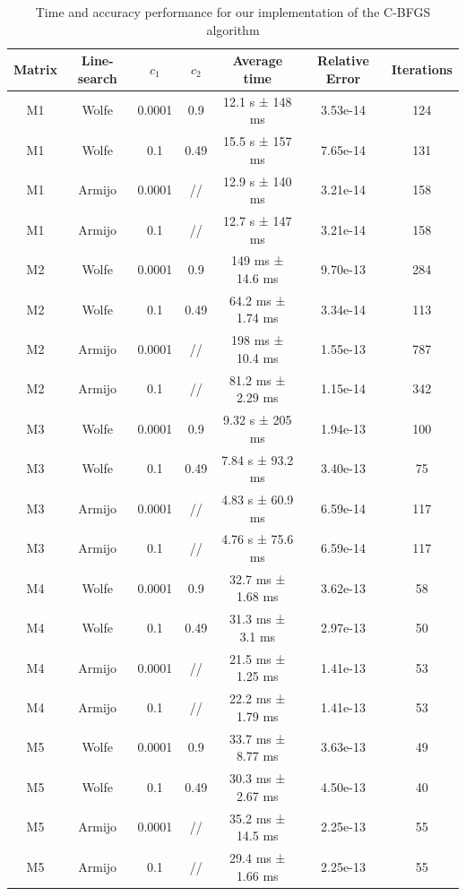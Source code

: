 \documentclass{article}
\numberwithin{equation}{section}
\begin{document}
\begin{table}[H]
    \centering
    \begin{tabular}{||c c c c c c c||}
 \hline
 Matrix & Line-search & $c_1$ & $c_2$ & Average time & Relative Error & Iterations \\ [0.8ex] 
 \hline\hline
 M1 & Wolfe & 0.0001 & 0.9 & 12.1 s ± 148 ms & 3.53e-14 & 124 \\ 
 \hline
 M1 & Wolfe & 0.1 & 0.49 & 15.5 s ± 157 ms & 7.65e-14 & 131 \\ 
 \hline
 M1 & Armijo & 0.0001 & // & 12.9 s ± 140 ms & 3.21e-14 & 158 \\ 
 \hline
 M1 & Armijo & 0.1 & // & 12.7 s ± 147 ms & 3.21e-14 & 158 \\
 \hline
 M2 & Wolfe & 0.0001 & 0.9 & 149 ms ± 14.6 ms & 9.70e-13 & 284 \\ 
 \hline
 M2 & Wolfe & 0.1 & 0.49 & 64.2 ms ± 1.74 ms & 3.34e-14 & 113 \\ 
 \hline
 M2 & Armijo & 0.0001 & // & 198 ms ± 10.4 ms & 1.55e-13 & 787 \\ 
 \hline
 M2 & Armijo & 0.1 & // & 81.2 ms ± 2.29 ms & 1.15e-14 & 342 \\ 
 \hline
 M3 & Wolfe & 0.0001 & 0.9 & 9.32 s ± 205 ms & 1.94e-13 & 100 \\ 
 \hline
 M3 & Wolfe & 0.1 & 0.49 & 7.84 s ± 93.2 ms & 3.40e-13 & 75 \\ 
 \hline
 M3 & Armijo & 0.0001 & // & 4.83 s ± 60.9 ms & 6.59e-14 & 117 \\ 
 \hline
 M3 & Armijo & 0.1 & // & 4.76 s ± 75.6 ms & 6.59e-14 & 117 \\ 
 \hline
 M4 & Wolfe & 0.0001 & 0.9 & 32.7 ms ± 1.68 ms & 3.62e-13 & 58 \\ 
 \hline
 M4 & Wolfe & 0.1 & 0.49 & 31.3 ms ± 3.1 ms & 2.97e-13 & 50 \\ 
 \hline
 M4 & Armijo & 0.0001 & // & 21.5 ms ± 1.25 ms & 1.41e-13 & 53 \\ 
 \hline
 M4 & Armijo & 0.1 & // & 22.2 ms ± 1.79 ms & 1.41e-13 & 53 \\ 
 \hline
 M5 & Wolfe & 0.0001 & 0.9 & 33.7 ms ± 8.77 ms & 3.63e-13 & 49 \\ 
 \hline
 M5 & Wolfe & 0.1 & 0.49 & 30.3 ms ± 2.67 ms & 4.50e-13 & 40 \\ 
 \hline
 M5 & Armijo & 0.0001 & // & 35.2 ms ± 14.5 ms & 2.25e-13 & 55 \\ 
 \hline
 M5 & Armijo & 0.1 & // & 29.4 ms ± 1.66 ms & 2.25e-13 & 55 \\
 \hline
 \end{tabular}
    \caption{Time and accuracy performance for our implementation of the C-BFGS algorithm}
    \label{tab:performance_BFGS}
\end{table}
\end{document}
